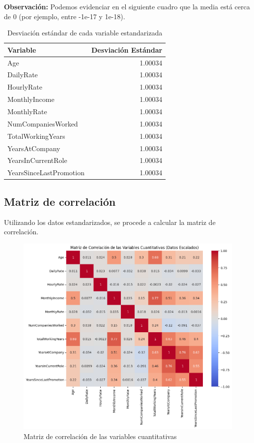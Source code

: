 \textbf{Observación:}
Podemos evidenciar en el siguiente cuadro que la media está 
cerca de 0 (por ejemplo, entre -1e-17 y 1e-18).

\begin{table}[H]
\centering
\begin{tabular}{|l|r|}
\hline
\textbf{Variable} & \textbf{Desviación Estándar} \\ \hline
Age                        & 1.00034 \\ \hline
DailyRate                  & 1.00034 \\ \hline
HourlyRate                 & 1.00034 \\ \hline
MonthlyIncome              & 1.00034 \\ \hline
MonthlyRate                & 1.00034 \\ \hline
NumCompaniesWorked         & 1.00034 \\ \hline
TotalWorkingYears          & 1.00034 \\ \hline
YearsAtCompany             & 1.00034 \\ \hline
YearsInCurrentRole         & 1.00034 \\ \hline
YearsSinceLastPromotion    & 1.00034 \\ \hline
\end{tabular}
\caption{Desviación estándar de cada variable estandarizada}
\end{table}

\subsection{Matriz de correlación}
Utilizando los datos estandarizados, se procede a calcular la matriz de correlación.

\begin{figure}[h!]
    \centering
    \includegraphics[width=1\textwidth]{images/matriz-de-correlacion.png}
    \caption{Matriz de correlación de las variables cuantitativas}
    \label{fig:matriz_correlacion}
\end{figure}

